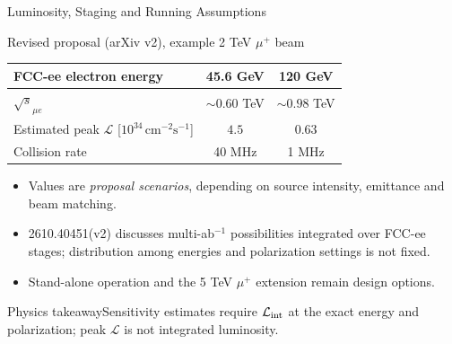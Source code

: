\documentclass[aspectratio=1610,english]{beamer}
\newcommand{\src}[1]{\vfill{\par\color{black!65}\fontsize{6.4}{7.4}\selectfont\emph{Source:} #1\par}}
\newcommand{\key}[1]{\begin{alertblock}{Physics takeaway}\small  #1\end{alertblock}}
\begin{document}
\begin{frame}[t]{Luminosity, Staging and Running Assumptions}
\footnotesize

\begin{block}{Revised proposal (arXiv v2), example 2 TeV $\mu^+$ beam}
\begin{center}\begin{tabular}{lcc}
\toprule
FCC-ee electron energy & 45.6 GeV & 120 GeV\\\midrule
$\sqrt{s}_{\mu e}$ & $\sim0.60$ TeV & $\sim0.98$ TeV\\
Estimated peak $\mathcal L$ [$10^{34}\,\mathrm{cm}^{-2}\mathrm{s}^{-1}$] & $4.5$ & $0.63$\\
Collision rate & 40 MHz & 1 MHz\\\bottomrule
\end{tabular}\end{center}
\end{block}
\begin{itemize}
\justifying
\item Values are \emph{proposal scenarios}, depending on source intensity, emittance and beam matching.
\item 2610.40451(v2) discusses multi-ab$^{-1}$ possibilities integrated over FCC-ee stages; distribution among energies and polarization settings is not fixed.
\item Stand-alone operation and the 5 TeV $\mu^+$ extension remain design options.
\end{itemize}
\key{Sensitivity estimates require $\mathcal L_{\rm int}$ at the exact energy and polarization; peak $\mathcal L$ is not integrated luminosity.}

\end{frame}
\end{document}
